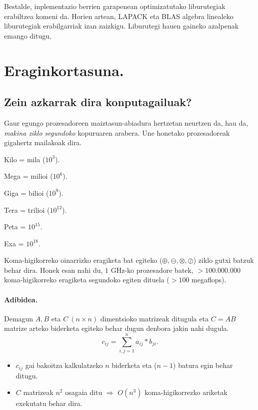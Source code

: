 Bestalde, inplementazio berrien garapenean optimizatutako liburutegiak erabiltzea komeni da. Horien artean, LAPACK eta BLAS algebra linealeko liburutegiak erabilgarriak izan zaizkigu. Liburutegi hauen gaineko azalpenak emango ditugu.

\section{Eraginkortasuna.}

\subsection*{\textbf{Zein azkarrak dira konputagailuak?}}

Gaur egungo prozesadoreen maiztasun-abiadura hertzetan neurtzen da, hau da,  \emph{makina ziklo segundoko} kopuruaren arabera. Une honetako prozesadoreak gigahertz mailakoak dira.
\begin{description}
\item {Kilo} = mila ($10^3$).
\item {Mega} = milioi ($10^6$).
\item {Giga} = bilioi ($10^9$).
\item {Tera} = trilioi ($10^{12}$).
\item {Peta} = $10^{15}$.
\item {Exa} = $10^{18}$. 
\end{description}

Koma-higikorreko oinarrizko eragiketa bat egiteko ($\oplus,\ominus,\otimes,\oslash$) ziklo gutxi batzuk behar dira. Honek esan nahi du, $1$ GHz-ko prozesadore batek,
$>100.000.000$ koma-higikorreko eragiketa segundoko egiten dituela ($>100$ megaflops).

\paragraph*{\textbf{Adibidea}.} 
Demagun $A,B$ eta $C \ (n \times n)$ dimentsioko matrizeak ditugula eta $C=AB$ matrize arteko biderketa egiteko behar dugun denbora jakin nahi dugula.
\begin{equation*}
c_{ij}=\sum\limits_{i,j=1}^{n} a_{ij}*b_{ji}.
\end{equation*}

\begin{itemize}
\item $c_{ij}$ gai bakoitza kalkulatzeko $n$ biderketa eta ($n-1$) batura egin behar ditugu.
\item $C$ matrizeak $n^2$ osagaia ditu $\Rightarrow$ $O(n^3)$ koma-higikorrezko ariketak exekutatu behar dira.
\end{itemize}

